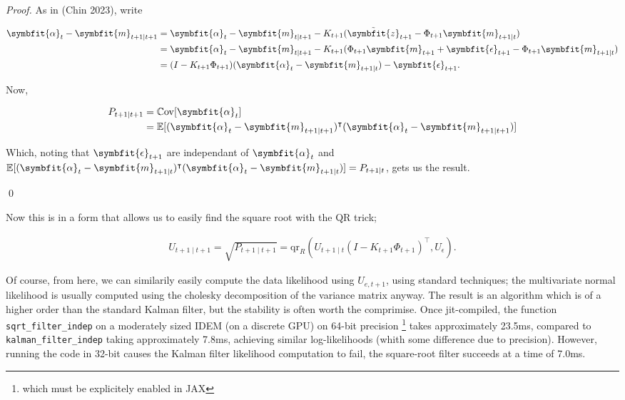 \documentclass[
]{report}
\newcommand{\bv}[1]{\symbfit{#1}}
\theoremstyle{plain}
\theoremstyle{plain}
\theoremstyle{remark}
\begin{document}
\begin{proof}
As in (Chin 2023), write

\[\begin{split}
  \bv \alpha_t - \bv m_{t+1\mid t+1} & = \bv \alpha_t - \bv m_{t \mid t+1} - K_{t+1} (\tilde{\bv z}_{t+1} - \Phi_{t+1} \bv m_{t+1\mid t})\\
  &= \bv \alpha_t - \bv m_{t \mid t+1} - K_{t+1} (\Phi_{t+1} \bv m_{t+1} + \bv \epsilon_{t+1} - \Phi_{t+1}\bv m_{t+1\mid t})\\
  &= (I - K_{t+1} \Phi_{t+1})(\bv \alpha_t - \bv m_{t+1 \mid t}) - \bv \epsilon_{t+1}.
\end{split}
\]

Now,

\[\begin{split}
  P_{t+1\mid t+1} &= \mathbb C\mathrm{ov}[\bv \alpha_t]\\
  &= \mathbb E[(\bv \alpha_t - \bv m_{t+1\mid t+1})^\intercal(\bv \alpha_t - \bv m_{t+1\mid t+1})]\\
\end{split}
\]

Which, noting that \(\bv \epsilon_{t+1}\) are independant of
\(\bv \alpha_t\) and
\(\mathbb E[(\bv \alpha_t - \bv m_{t+1 \mid t})^\intercal (\bv \alpha_t - \bv m_{t+1 \mid t})]=P_{t+1\mid t}\),
gets us the result.

\qed
\end{proof}

Now this is in a form that allows us to easily find the square root with
the QR trick;

\[\begin{split}
U_{t+1\mid t+1} = \sqrt{P_{t+1\mid t+1}} = \mathrm{qr}_R(U_{t+1\mid t}(I - K_{t+1} \Phi_{t+1})^{\intercal}, U_\epsilon).
\end{split}
\]

Of course, from here, we can similarily easily compute the data
likelihood using \(U_{e,t+1}\), using standard techniques; the
multivariate normal likelihood is usually computed using the cholesky
decomposition of the variance matrix anyway. The result is an algorithm
which is of a higher order than the standard Kalman filter, but the
stability is often worth the comprimise. Once jit-compiled, the function
\texttt{sqrt\_filter\_indep} on a moderately sized IDEM (on a discrete
GPU) on 64-bit precision \footnote{which must be explicitely enabled in
  JAX} takes approximately 23.5ms, compared to
\texttt{kalman\_filter\_indep} taking approximately 7.8ms, achieving
similar log-likelihoods (whith some difference due to precision).
However, running the code in 32-bit causes the Kalman filter likelihood
computation to fail, the square-root filter succeeds at a time of 7.0ms.
\end{document}
